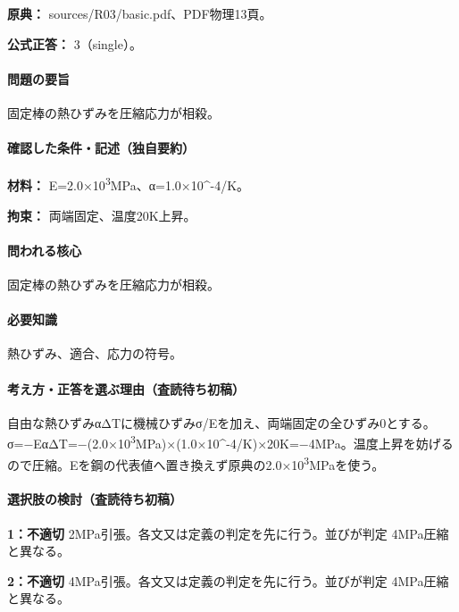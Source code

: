 \noindent\textbf{原典：} sources/R03/basic.pdf、PDF物理13頁。

\textbf{公式正答：} 3（single）。

\paragraph{問題の要旨} 固定棒の熱ひずみを圧縮応力が相殺。

\paragraph{確認した条件・記述（独自要約）}\mbox{}\par

\noindent\textbf{材料：} E=\allowbreak{}2.0×10\textsuperscript{3}MPa、α=1.0×10\textasciicircum{}-4/K。\par

\noindent\textbf{拘束：} 両端固定、温度20K上昇。\par

\paragraph{問われる核心} 固定棒の熱ひずみを圧縮応力が相殺。

\paragraph{必要知識} 熱ひずみ、適合、応力の符号。

\paragraph{考え方・正答を選ぶ理由（査読待ち初稿）} 自由な熱ひずみαΔTに機械ひずみσ/Eを加え、両端固定の全ひずみ0とする。σ=−EαΔT=−(2.0×10\textsuperscript{3}MPa)×(1.0×10\textasciicircum{}-4/K)×20K=−4MPa。温度上昇を妨げるので圧縮。Eを鋼の代表値へ置き換えず原典の2.0×10\textsuperscript{3}MPaを使う。

\paragraph{選択肢の検討（査読待ち初稿）}\mbox{}\par

\noindent\textbf{1：不適切} 2MPa引張。各文又は定義の判定を先に行う。並びが判定 4MPa圧縮 と異なる。\par

\noindent\textbf{2：不適切} 4MPa引張。各文又は定義の判定を先に行う。並びが判定 4MPa圧縮 と異なる。\par

